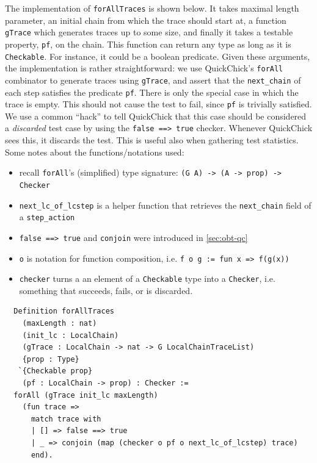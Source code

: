 \documentclass[twoside,11pt,openright]{report}
\newenvironment{code}{\captionsetup{type=figure, singlelinecheck=off, justification=raggedleft}}{}
\newcommand{\coq}[1]{\texttt{#1}}
\begin{document}
The implementation of \coq{forAllTraces} is shown below. It takes maximal length parameter, an initial chain from which the trace should start at, a function \coq{gTrace} which generates traces up to some size, and finally it takes a testable property, \coq{pf}, on the chain. This function can return any type as long as it is \coq{Checkable}. For instance, it could be a boolean predicate. Given these arguments, the implementation is rather straightforward: we use QuickChick's \coq{forAll} combinator to generate traces using \coq{gTrace}, and assert that the \coq{next\_chain} of each step satisfies the predicate \coq{pf}. There is only the special case in which the trace is empty. This should not cause the test to fail, since \coq{pf} is trivially satisfied. We use a common ``hack'' to tell QuickChick that this case should be considered a \textit{discarded} test case by using the \coq{false ==> true} checker. Whenever QuickChick sees this, it discards the test. This is useful also when gathering test statistics. Some notes about the functions/notations used:
\begin{itemize}
    \item recall \coq{forAll}'s (simplified) type signature: \coq{(G A) -> (A -> prop) -> Checker}
    \item \coq{next\_lc\_of\_lcstep} is a helper function that retrieves the \coq{next\_chain} field of a \coq{step\_action} 
    \item \coq{false ==> true} and \coq{conjoin} were introduced in \autoref{sec:obt-qc}
    \item \coq{o} is notation for function composition, i.e. \coq{f o g := fun x => f(g(x))}
    \item \coq{checker} turns a an element of a \coq{Checkable} type into a \coq{Checker}, i.e. something that succeeds, fails, or is discarded. 
\end{itemize}
\begin{code}
\label{def:forAllTraces}
\begin{verbatim}
  Definition forAllTraces 
    (maxLength : nat)
    (init_lc : LocalChain)
    (gTrace : LocalChain -> nat -> G LocalChainTraceList)
    {prop : Type}
   `{Checkable prop}
    (pf : LocalChain -> prop) : Checker :=
  forAll (gTrace init_lc maxLength) 
    (fun trace => 
      match trace with
      | [] => false ==> true
      | _ => conjoin (map (checker o pf o next_lc_of_lcstep) trace)
      end). 
\end{verbatim}
\end{code}
\end{document}
